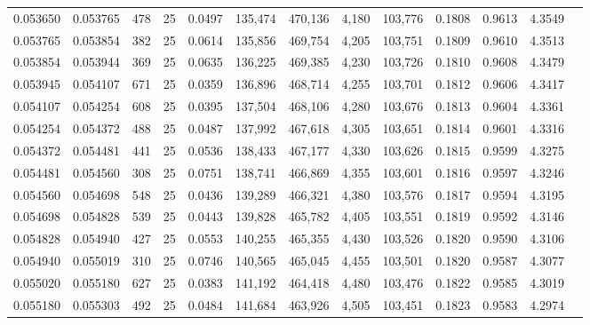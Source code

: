 \begin{tabular}{rrrrrrrrrrrrr}
0.053650 & 0.053765 &   478 &  25 &                                     0.0497 & 135,474 & 470,136 &   4,180 & 103,776 & 0.1808 & 0.9613 & 4.3549 \\
0.053765 & 0.053854 &   382 &  25 &                                     0.0614 & 135,856 & 469,754 &   4,205 & 103,751 & 0.1809 & 0.9610 & 4.3513 \\
0.053854 & 0.053944 &   369 &  25 &                                     0.0635 & 136,225 & 469,385 &   4,230 & 103,726 & 0.1810 & 0.9608 & 4.3479 \\
0.053945 & 0.054107 &   671 &  25 &                                     0.0359 & 136,896 & 468,714 &   4,255 & 103,701 & 0.1812 & 0.9606 & 4.3417 \\
0.054107 & 0.054254 &   608 &  25 &                                     0.0395 & 137,504 & 468,106 &   4,280 & 103,676 & 0.1813 & 0.9604 & 4.3361 \\
0.054254 & 0.054372 &   488 &  25 &                                     0.0487 & 137,992 & 467,618 &   4,305 & 103,651 & 0.1814 & 0.9601 & 4.3316 \\
0.054372 & 0.054481 &   441 &  25 &                                     0.0536 & 138,433 & 467,177 &   4,330 & 103,626 & 0.1815 & 0.9599 & 4.3275 \\
0.054481 & 0.054560 &   308 &  25 &                                     0.0751 & 138,741 & 466,869 &   4,355 & 103,601 & 0.1816 & 0.9597 & 4.3246 \\
0.054560 & 0.054698 &   548 &  25 &                                     0.0436 & 139,289 & 466,321 &   4,380 & 103,576 & 0.1817 & 0.9594 & 4.3195 \\
0.054698 & 0.054828 &   539 &  25 &                                     0.0443 & 139,828 & 465,782 &   4,405 & 103,551 & 0.1819 & 0.9592 & 4.3146 \\
0.054828 & 0.054940 &   427 &  25 &                                     0.0553 & 140,255 & 465,355 &   4,430 & 103,526 & 0.1820 & 0.9590 & 4.3106 \\
0.054940 & 0.055019 &   310 &  25 &                                     0.0746 & 140,565 & 465,045 &   4,455 & 103,501 & 0.1820 & 0.9587 & 4.3077 \\
0.055020 & 0.055180 &   627 &  25 &                                     0.0383 & 141,192 & 464,418 &   4,480 & 103,476 & 0.1822 & 0.9585 & 4.3019 \\
0.055180 & 0.055303 &   492 &  25 &                                     0.0484 & 141,684 & 463,926 &   4,505 & 103,451 & 0.1823 & 0.9583 & 4.2974 \\

\end{tabular}
